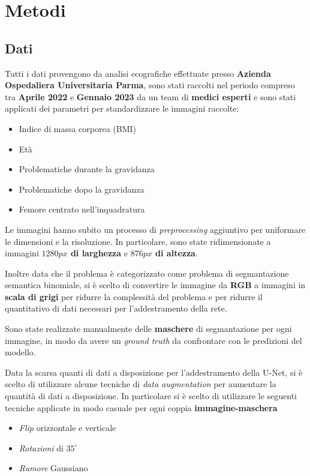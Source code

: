 \chapter{Metodi} %
\label{cha:Metodi}

\section{Dati} %
Tutti i dati provengono da analisi ecografiche effettuate presso 
\textbf{Azienda Ospedaliera Universitaria Parma}, sono stati raccolti nel periodo compreso tra 
\textbf{Aprile 2022} e \textbf{Gennaio 2023} da un team di \textbf{medici esperti} e sono stati applicati
dei parametri per standardizzare le immagini raccolte:
\begin{itemize}
    \item Indice di massa corporea (BMI)
    \item Età
    \item Problematiche durante la gravidanza
    \item Problematiche dopo la gravidanza
    \item Femore centrato nell'inquadratura
\end{itemize}



Le immagini hanno subito un processo di \textit{preprocessing} aggiuntivo per
uniformare le dimensioni e la risoluzione. In particolare, sono state
ridimensionate a immagini \textbf{$1280px$ di larghezza} e \textbf{$876px$ di
altezza}.

Inoltre data che il problema è categorizzato come problema di segmantazione
semantica binomiale, si è scelto di convertire le immagine da \textbf{RGB} a
immagini in \textbf{scala di grigi} per ridurre la complessità del problema e
per ridurre il quantitativo di dati necessari per l'addestramento della rete.

Sono state realizzate manualmente delle \textbf{maschere} di segmantazione per
ogni immagine, in modo da avere un \textit{ground truth} da confrontare con le
predizioni del modello.

Data la scarsa quanti di dati a disposizione per l'addestramento della U-Net, si è scelto di utilizzare alcune tecniche di \textit{data augmentation} per aumentare la quantità di dati a disposizione. In particolare si è scelto di utilizzare le seguenti tecniche applicate in modo casuale per ogni coppia \textbf{immagine-maschera}
\begin{itemize}
	\item \textit{Flip} orizzontale e verticale
	\item \textit{Rotazioni} di $35^{\circ}$
	\item \textit{Rumore} Gaussiano
\end{itemize}


